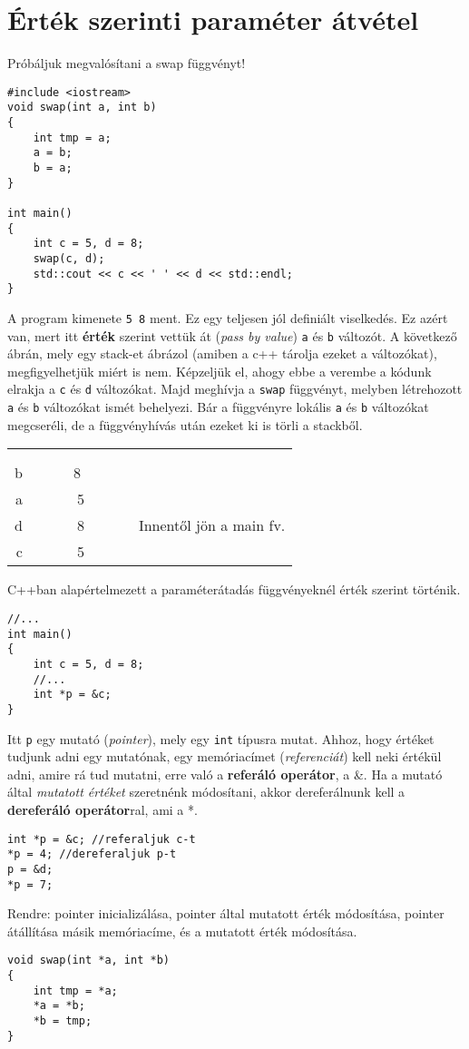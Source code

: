 \documentclass[a4paper,11.5pt]{article}
\begin{document}
	\section{Érték szerinti paraméter átvétel}
	Próbáljuk megvalósítani a swap függvényt!
		\begin{lstlisting}
#include <iostream>
void swap(int a, int b)
{
	int tmp = a;
	a = b;
	b = a;
}

int main()
{
	int c = 5, d = 8;
	swap(c, d);
	std::cout << c << ' ' << d << std::endl;
}
		\end{lstlisting}		
		A program kimenete \texttt{5 8} ment. Ez egy teljesen jól definiált viselkedés. Ez azért van, mert itt \textbf{érték} szerint vettük át (\textit{pass by value}) \texttt{a} és \texttt{b} változót. A következő ábrán, mely egy stack-et ábrázol (amiben a c++ tárolja ezeket a változókat), megfigyelhetjük miért is nem. Képzeljük el, ahogy ebbe a verembe a kódunk elrakja a \texttt{c} és \texttt{d} változókat. Majd meghívja a \texttt{swap} függvényt, melyben létrehozott \texttt{a} és \texttt{b} változókat ismét behelyezi. Bár a függvényre lokális \texttt{a} és \texttt{b} változókat megcseréli, de a függvényhívás után ezeket ki is törli a stackből.
		\begin{center}
			\begin{tabular}{r|c|l}
				&&\\
				&&\\
				\cline{2-2}
				b&~~~~~8~~~~~~&\\
				\cline{2-2}
				a&5&\\
				\cline{2-2}
				\hline
				\hline
				d&8& Innentől jön a main fv.\\
				\cline{2-2}
				c&5&\\
				\cline{2-2}
			\end{tabular}
		\end{center}
		C++ban alapértelmezett a paraméterátadás függvényeknél érték szerint történik.
		
		\begin{lstlisting}
//...
int main()
{
	int c = 5, d = 8;
	//...
	int *p = &c;
}
		\end{lstlisting}
		Itt \texttt{p} egy mutató (\textit{pointer}), mely egy \texttt{int} típusra mutat. Ahhoz, hogy értéket tudjunk adni egy mutatónak, egy memóriacímet (\textit{referenciát}) kell neki értékül adni, amire rá tud mutatni, erre való a \textbf{referáló operátor}, a \&. Ha a mutató által \textit{mutatott értéket} szeretnénk módosítani, akkor dereferálnunk kell a \textbf{dereferáló operátor}ral, ami a *.
		\begin{lstlisting}
int *p = &c; //referaljuk c-t
*p = 4; //dereferaljuk p-t
p = &d;
*p = 7;
		\end{lstlisting}
		Rendre: pointer inicializálása, pointer által mutatott érték módosítása, pointer átállítása másik memóriacíme, és a mutatott érték módosítása.
		\begin{lstlisting}
void swap(int *a, int *b)
{
	int tmp = *a;
	*a = *b;
	*b = tmp;
}
		\end{lstlisting}
		
\end{document}
